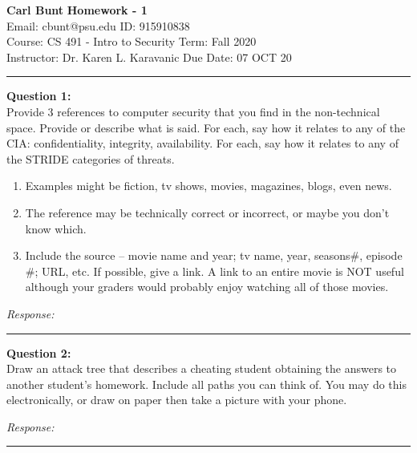 \documentclass[a4paper, 11pt]{article}
\newenvironment{problem}[2][Question]
               { \begin{mdframed}[backgroundcolor=gray!20] \textbf{#1 #2:} \\}
               {  \end{mdframed}}
\newenvironment{response}
                {\textit{Response:}}
                {}
\begin{document}
 \noindent
 \large\textbf{Carl Bunt} \hfill \textbf{Homework - 1}   \\
 Email: cbunt@psu.edu \hfill ID: 915910838 \\
 \normalsize Course: CS 491 - Intro to Security \hfill Term: Fall 2020\\
 Instructor: Dr. Karen L. Karavanic \hfill Due Date: 07 OCT 20\\
 \noindent\rule{7in}{2.8pt}

 \begin{problem}{1}
   Provide 3 references to computer security that you find in the non-technical space.  Provide or describe what is said.  For each, say how it relates to any of the CIA:  confidentiality, integrity, availability.  For each, say how it relates to any of the STRIDE categories of threats.
   \begin{enumerate}[label=\alpha*.]
   \item Examples might be fiction, tv shows, movies, magazines, blogs, even news.
   \item The reference may be technically correct or incorrect, or maybe you don’t know which.
   \item Include the source – movie name and year;  tv name, year, seasons#, episode \#; URL, etc.  If possible, give a link.  A link to an entire movie is NOT useful although your graders would probably enjoy watching all of those movies.
   \end{enumerate}
 \end{problem}

 \begin{response}
 \end{response}
 \noindent\rule{7in}{2.8pt}

 \begin{problem}{2}
   Draw an attack tree that describes a cheating student obtaining the answers to another student’s homework.  Include all paths you can think of.  You may do this electronically, or draw on paper then take a picture with your phone.
 \end{problem}
 
 \begin{response}
 \end{response}
 \noindent\rule{7in}{2.8pt}
\end{document}
